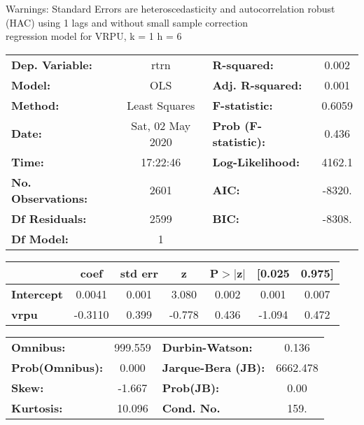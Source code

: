 Warnings: \newline
 [1] Standard Errors are heteroscedasticity and autocorrelation robust (HAC) using 1 lags and without small sample correction\\ 

regression model for VRPU, k = 1 h = 6\begin{center}
\begin{tabular}{lclc}
\toprule
\textbf{Dep. Variable:}    &       rtrn       & \textbf{  R-squared:         } &     0.002   \\
\textbf{Model:}            &       OLS        & \textbf{  Adj. R-squared:    } &     0.001   \\
\textbf{Method:}           &  Least Squares   & \textbf{  F-statistic:       } &    0.6059   \\
\textbf{Date:}             & Sat, 02 May 2020 & \textbf{  Prob (F-statistic):} &    0.436    \\
\textbf{Time:}             &     17:22:46     & \textbf{  Log-Likelihood:    } &    4162.1   \\
\textbf{No. Observations:} &        2601      & \textbf{  AIC:               } &    -8320.   \\
\textbf{Df Residuals:}     &        2599      & \textbf{  BIC:               } &    -8308.   \\
\textbf{Df Model:}         &           1      & \textbf{                     } &             \\
\bottomrule
\end{tabular}
\begin{tabular}{lcccccc}
                   & \textbf{coef} & \textbf{std err} & \textbf{z} & \textbf{P$> |$z$|$} & \textbf{[0.025} & \textbf{0.975]}  \\
\midrule
\textbf{Intercept} &       0.0041  &        0.001     &     3.080  &         0.002        &        0.001    &        0.007     \\
\textbf{vrpu}      &      -0.3110  &        0.399     &    -0.778  &         0.436        &       -1.094    &        0.472     \\
\bottomrule
\end{tabular}
\begin{tabular}{lclc}
\textbf{Omnibus:}       & 999.559 & \textbf{  Durbin-Watson:     } &    0.136  \\
\textbf{Prob(Omnibus):} &   0.000 & \textbf{  Jarque-Bera (JB):  } & 6662.478  \\
\textbf{Skew:}          &  -1.667 & \textbf{  Prob(JB):          } &     0.00  \\
\textbf{Kurtosis:}      &  10.096 & \textbf{  Cond. No.          } &     159.  \\
\bottomrule
\end{tabular}
\end{center}

